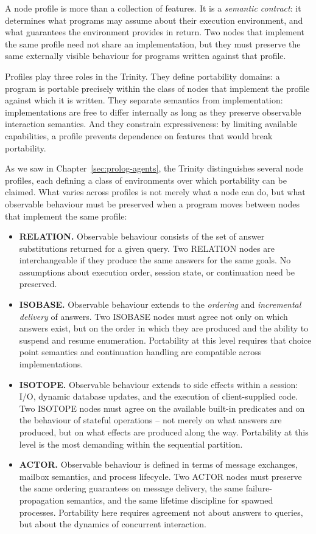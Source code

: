 \noindent A node profile is more than a collection of features. It is a
\emph{semantic contract}: it determines what programs may assume about
their execution environment, and what guarantees the environment provides
in return. Two nodes that implement the same profile need not share an
implementation, but they must preserve the same externally visible
behaviour for programs written against that profile.

Profiles play three roles in the Trinity. They define portability
domains: a program is portable precisely within the class of nodes that
implement the profile against which it is written. They separate
semantics from implementation: implementations are free to differ
internally as long as they preserve observable interaction semantics.
And they constrain expressiveness: by limiting available capabilities, a
profile prevents dependence on features that would break portability.

As we saw in Chapter~\ref{sec:prolog-agents}, the Trinity distinguishes
several node profiles, each defining a class of environments over which
portability can be claimed. What varies across profiles is not merely
what a node can do, but what observable behaviour must be preserved when
a program moves between nodes that implement the same profile:

\begin{itemize}
\item \textbf{RELATION.} Observable behaviour consists of the set of
answer substitutions returned for a given query. Two RELATION nodes are
interchangeable if they produce the same answers for the same goals.
No assumptions about execution order, session state, or continuation
need be preserved.

\item \textbf{ISOBASE.} Observable behaviour extends to the
\emph{ordering} and \emph{incremental delivery} of answers. Two ISOBASE
nodes must agree not only on which answers exist, but on the order in
which they are produced and the ability to suspend and resume
enumeration. Portability at this level requires that choice point
semantics and continuation handling are compatible across
implementations.

\item \textbf{ISOTOPE.} Observable behaviour extends to side effects
within a session: I/O, dynamic database updates, and the execution of
client-supplied code. Two ISOTOPE nodes must agree on the available
built-in predicates and on the behaviour of stateful operations --
not merely on what answers are produced, but on what effects are
produced along the way. Portability at this level is the most demanding
within the sequential partition.

\item \textbf{ACTOR.} Observable behaviour is defined in terms of
message exchanges, mailbox semantics, and process lifecycle. Two ACTOR
nodes must preserve the same ordering guarantees on message delivery,
the same failure-propagation semantics, and the same lifetime
discipline for spawned processes. Portability here requires agreement
not about answers to queries, but about the dynamics of concurrent
interaction.
\end{itemize}

